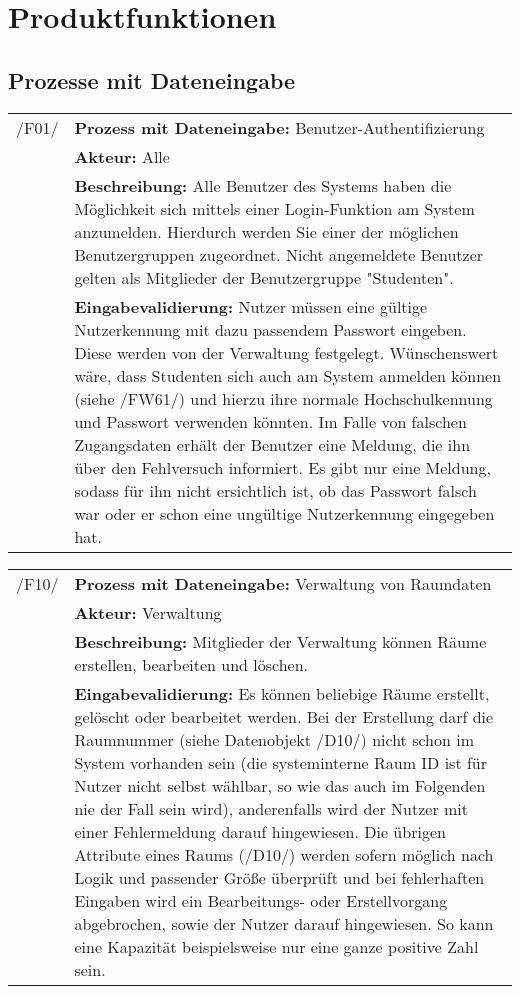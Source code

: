 \section{Produktfunktionen}
\label{sec:Produktfunktionen}

\subsection{Prozesse mit Dateneingabe}

\begin{tabular}{p{1.5cm}p{14.5cm}}


	 /F01/	& \textbf{Prozess mit Dateneingabe:} Benutzer-Authentifizierung \\
				& \textbf{Akteur:} Alle \\
				& \textbf{Beschreibung:} Alle Benutzer des Systems haben die Möglichkeit sich mittels einer Login-Funktion am System anzumelden. Hierdurch werden Sie einer der möglichen Benutzergruppen zugeordnet. Nicht angemeldete Benutzer gelten als Mitglieder der Benutzergruppe "Studenten". \\
				& \textbf{Eingabevalidierung:} Nutzer müssen eine gültige Nutzerkennung mit dazu passendem Passwort eingeben. Diese werden von der Verwaltung festgelegt. Wünschenswert wäre, dass Studenten sich auch am System anmelden können (siehe /FW61/) und hierzu ihre normale Hochschulkennung und Passwort verwenden könnten. Im Falle von falschen Zugangsdaten erhält der Benutzer eine Meldung, die ihn über den Fehlversuch informiert. Es gibt nur eine Meldung, sodass für ihn nicht ersichtlich ist, ob das Passwort falsch war oder er schon eine ungültige Nutzerkennung eingegeben hat.\\[0.25cm]

\end{tabular}


\begin{tabular}{p{1.5cm}p{14.5cm}}
		
	 /F10/	& \textbf{Prozess mit Dateneingabe:} Verwaltung von Raumdaten \\
				& \textbf{Akteur:} Verwaltung \\
				& \textbf{Beschreibung:} Mitglieder der Verwaltung können Räume erstellen, bearbeiten und löschen. \\
				& \textbf{Eingabevalidierung:} Es können beliebige Räume erstellt, gelöscht oder bearbeitet werden. Bei der Erstellung darf die Raumnummer (siehe Datenobjekt /D10/) nicht schon im System vorhanden sein (die systeminterne Raum ID ist für Nutzer nicht selbst wählbar, so wie das auch im Folgenden nie der Fall sein wird), anderenfalls wird der Nutzer mit einer Fehlermeldung darauf hingewiesen. Die übrigen Attribute eines Raums (/D10/) werden sofern möglich nach Logik und passender Größe überprüft und bei fehlerhaften Eingaben wird ein Bearbeitungs- oder Erstellvorgang abgebrochen, sowie der Nutzer darauf hingewiesen. So kann eine Kapazität beispielsweise nur eine ganze positive Zahl sein. \\[0.25cm]

\end{tabular}


